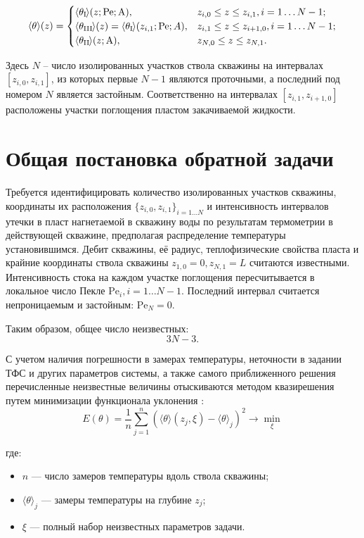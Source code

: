 \documentclass[12pt]{article}
\newcommand{\ri}[1]{\mathrm{#1}\kern-0.1em}
\begin{document}
\[
\langle \theta \rangle(z) =
\begin{cases}
\langle \theta_{\ri{I}} \rangle(z; \text{Pe}; \text{A}), & z_{i,0} \leq z \leq z_{i,1}, i=1 \dots N-1; \\
\langle \theta_{\ri{III}} \rangle(z) = \langle \theta_{\ri{I}} \rangle(z_{i,1}; \text{Pe}; A), & z_{i,1} \leq z \leq z_{i+1,0}, i=1 \dots N-1; \\
\langle \theta_{\ri{II}} \rangle(z; \text{A}), & z_{N,0} \leq z \leq z_{N,1}. \\
\end{cases}
\]

Здесь \( N \) -- число изолированных участков ствола скважины на интервалах \([z_{i,0}, z_{i,1}]\),
из которых первые \( N-1 \) являются проточными, а последний под номером \( N \) является застойным.
Соответственно на интервалах \([z_{i,1}, z_{i+1,0}]\) расположены участки поглощения пластом закачиваемой жидкости.

\section*{Общая постановка обратной задачи}

Требуется идентифицировать количество изолированных участков скважины, координаты их расположения
$\{z_{i,0}, z_{i,1}\}_{i = 1 \dots N}$
и интенсивность интервалов утечки в пласт нагнетаемой в скважину воды по результатам термометрии
в действующей скважине, предполагая распределение температуры установившимся. Дебит скважины, её радиус,
теплофизические свойства пласта и крайние координаты ствола скважины $z_{1,0} = 0, z_{N,1} = L$
считаются известными. Интенсивность стока на каждом участке
поглощения пересчитывается в локальное число Пекле $\text{Pe}_i, i = 1 \dots N-1$.
Последний интервал считается непроницаемым и застойным: $\text{Pe}_N = 0$.

Таким образом, общее число неизвестных:
\[
3N - 3.
\]

С учетом наличия погрешности в замерах температуры, неточности в задании ТФС и других параметров системы,
а также самого приближенного решения перечисленные
неизвестные величины отыскиваются методом квазирешения путем минимизации функционала
уклонения :
\[
E(\theta) = \frac{1}{n} \sum_{j=1}^{n} \left( \langle \theta \rangle(z_j, \xi) - \langle \theta \rangle_j \right)^2 \rightarrow \min_{\xi} \tag{1}
\]

где:
\begin{itemize}
  \item $n$ — число замеров температуры вдоль ствола скважины;
  \item $\langle \theta \rangle_j$ — замеры температуры на глубине $z_j$;
  \item $\xi$ — полный набор неизвестных параметров задачи.
\end{itemize}
\end{document}
